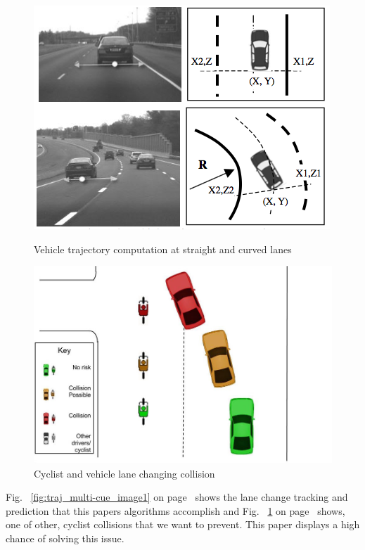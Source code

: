 \documentclass[a4paper]{report}
\begin{document}
{\begin{figure}[h]
\centering
	\begin{minipage}{0.49\textwidth}
		\centering
		\includegraphics[scale=0.4]{figures/research_paper_figures/trajectory_multi-cue}
		\caption{Vehicle trajectory computation at straight and curved lanes \citep{multi-cue} }
		\label{fig:traj_multi-cue_image1}
	\end{minipage}\hfill
	\begin{minipage}{0.49\textwidth}
		\centering
		\includegraphics[scale=0.2]{figures/collision_avoidance_figures/Vehicle_changing_lane_into_the_path_of_a_cyclist}
		\caption{Cyclist and vehicle lane changing collision}
		\label{fig:change_lane_image}
	\end{minipage}
\end{figure}

Fig. ~\ref{fig:traj_multi-cue_image1} on page~\pageref{fig:traj_multi-cue_image1} shows the lane change tracking and prediction that this papers algorithms accomplish and Fig. ~\ref{fig:change_lane_image} on page~\pageref{fig:change_lane_image} shows, one of other, cyclist collisions that we want to prevent. This paper displays a high chance of solving this issue.


}
\end{document}
